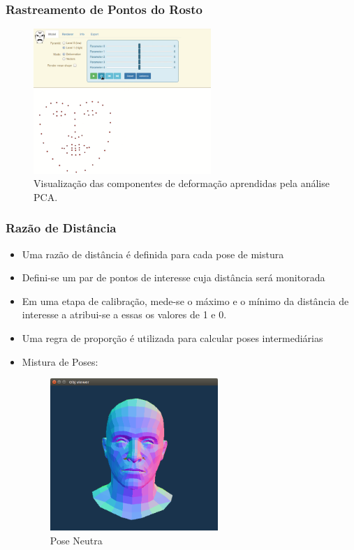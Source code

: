 \documentclass[brazil]{beamer}
\begin{document}
\begin{frame}
\frametitle{Rastreamento de Pontos do Rosto}
      \begin{figure}
          \centering
          \includegraphics[width = 0.6\textwidth, keepaspectratio]{./img/pca_exaplained.png}
          \caption{Visualização das componentes de deformação aprendidas pela análise PCA.}
      \end{figure}
\end{frame}

\begin{frame}
\frametitle{Razão de Distância}
  \begin{itemize}
      \item Uma razão de distância é definida para cada pose de mistura
      \item Defini-se um par de pontos de interesse cuja distância será
        monitorada
      \item Em uma etapa de calibração, mede-se o máximo e o mínimo da
        distância de interesse a atribui-se a essas os valores de 1 e 0.
      \item Uma regra de proporção é utilizada para calcular poses
        intermediárias
  \end{itemize} 
\end{frame}


\begin{frame}
  \begin{itemize}
  \item Mistura de Poses:
  \begin{figure}
\centering
\includegraphics[width = 0.6\textwidth, keepaspectratio]{./img/rosto-neutro.png}
        \caption{Pose Neutra}
     \end{figure}         
  \end{itemize} 
\end{frame}
\end{document}
